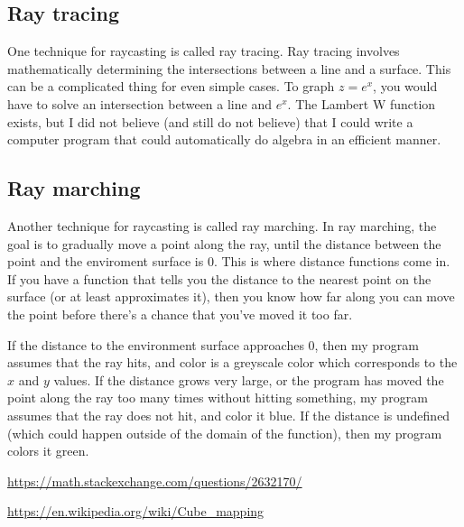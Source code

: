 \subsection*{Ray tracing}

One technique for raycasting is called ray tracing.  Ray tracing involves mathematically determining the intersections between a line and a surface.  This can be a complicated thing for even simple cases.  To graph $z=e^x$, you would have to solve an intersection between a line and $e^x$.  The Lambert W function exists, but I did not believe (and still do not believe) that I could write a computer program that could automatically do algebra in an efficient manner.

\subsection*{Ray marching}

Another technique for raycasting is called ray marching.  In ray marching, the goal is to gradually move a point along the ray, until the distance between the point and the enviroment surface is 0.  This is where distance functions come in.  If you have a function that tells you the distance to the nearest point on the surface (or at least approximates it), then you know how far along you can move the point before there's a chance that you've moved it too far.

If the distance to the environment surface approaches 0, then my program assumes that the ray hits, and color is a greyscale color which corresponds to the $x$ and $y$ values.  If the distance grows very large, or the program has moved the point along the ray too many times without hitting something, my program assumes that the ray does not hit, and color it blue.  If the distance is undefined (which could happen outside of the domain of the function), then my program colors it green.

\url{https://math.stackexchange.com/questions/2632170/}

\url{https://en.wikipedia.org/wiki/Cube_mapping}


